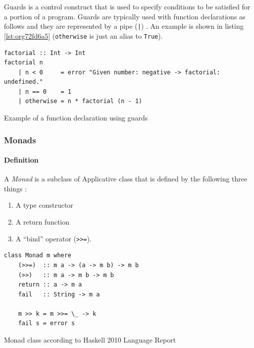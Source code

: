 \documentclass[a4paper, titlepage, twoside]{article}
\begin{document}
Guards is a control construct that is used to specify conditions to be satisfied for a portion of a program. Guards are typically used with function declarations as follows and they are represented by a pipe (\texttt{|}) \autocite{kremerCPSC449Programming2015}. An example is shown in listing \ref{lst:org72fd6a5} (\texttt{otherwise} is just an alias to \texttt{True}).

\begin{listing}[htbp]
\begin{verbatim}
factorial :: Int -> Int
factorial n
    | n < 0     = error "Given number: negative -> factorial: undefined."
    | n == 0    = 1
    | otherwise = n * factorial (n - 1)
\end{verbatim}
\caption{\label{lst:org72fd6a5}Example of a function declaration using guards}
\end{listing}

\subsubsection{Monads}
\label{sec:orgceaa2f1}

\paragraph*{Definition}
\label{sec:orgde49126}

A \emph{Monad} is a subclass of Applicative class that is defined by the following three things  \autocite{wikibooksHaskellUnderstandingMonads2021}:

\begin{enumerate}
\item A type constructor
\item A return function
\item A ``bind'' operator (\texttt{>{}>{}=}).
\end{enumerate}

\begin{listing}[htbp]
\begin{verbatim}
class Monad m where
    (>>=)  :: m a -> (a -> m b) -> m b
    (>>)   :: m a -> m b -> m b
    return :: a -> m a
    fail   :: String -> m a
    
    m >> k = m >>= \_ -> k
    fail s = error s
\end{verbatim}
\caption{Monad class according to Haskell 2010 Language Report \autocite[chapter 6.3.6]{marlowHaskell2010Language2010}}
\end{listing}
\end{document}
